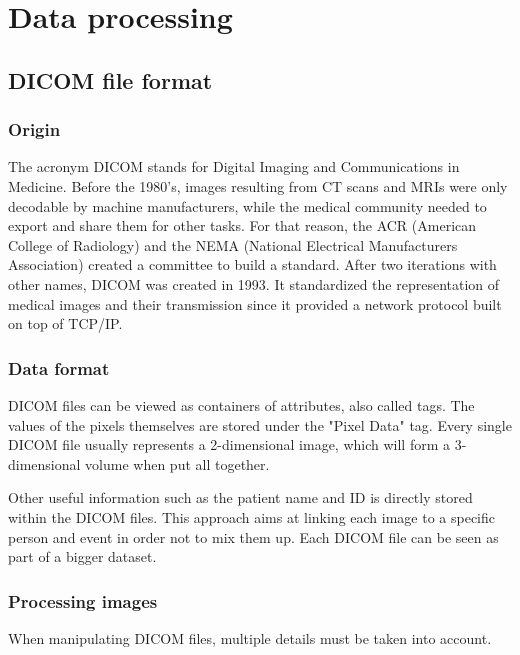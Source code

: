 
\chapter{Data processing}
\label{ch:data_processing}

\section{DICOM file format}

\subsection{Origin}

The acronym DICOM stands for Digital Imaging and Communications in Medicine. Before the 1980’s, images resulting from CT scans and MRIs were only decodable by machine manufacturers, while the medical community needed to export and share them for other tasks. For that reason, the ACR (American College of Radiology) and the NEMA (National Electrical Manufacturers Association) created a committee to build a standard. After two iterations with other names, DICOM was created in 1993. It standardized the representation of medical images and their transmission since it provided a network protocol built on top of TCP/IP.


\subsection{Data format}

DICOM files can be viewed as containers of attributes, also called tags. The values of the pixels themselves are stored under the "Pixel Data" tag. Every single DICOM file usually represents a 2-dimensional image, which will form a 3-dimensional volume when put all together. 

Other useful information such as the patient name and ID is directly stored within the DICOM files. This approach aims at linking each image to a specific person and event in order not to mix them up. Each DICOM file can be seen as part of a bigger dataset. 


\subsection{Processing images}

When manipulating DICOM files, multiple details must be taken into account. 

